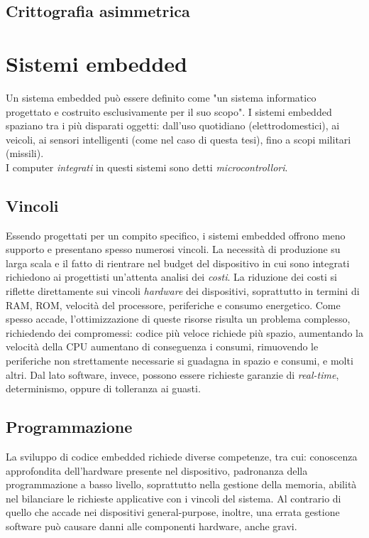 \documentclass[target=bach,aauheader=,style=]{thud}
\begin{document}
        \subsection{Crittografia asimmetrica}

    \section{Sistemi embedded}
    Un sistema embedded può essere definito come "un sistema informatico progettato e costruito esclusivamente per il suo scopo"\cite{embeddedsys}.
    I sistemi embedded spaziano tra i più disparati oggetti: dall'uso quotidiano (elettrodomestici), ai veicoli, ai sensori intelligenti (come nel caso di questa tesi), fino a scopi militari (missili).\\
    I computer \textit{integrati} in questi sistemi sono detti \textit{microcontrollori}\cite{architetture}.
    
    	\subsection{Vincoli}
    	Essendo progettati per un compito specifico, i sistemi embedded offrono meno supporto e presentano spesso numerosi vincoli. La necessità di produzione su larga scala e il fatto di rientrare nel budget del dispositivo in cui sono integrati richiedono ai progettisti un'attenta analisi dei \textit{costi}. La riduzione dei costi si riflette direttamente sui vincoli \textit{hardware} dei dispositivi, soprattutto in termini di RAM, ROM, velocità del processore, periferiche e consumo energetico. Come spesso accade, l'ottimizzazione di queste risorse risulta un problema complesso, richiedendo dei compromessi: codice più veloce richiede più spazio, aumentando la velocità della CPU aumentano di conseguenza i consumi, rimuovendo le periferiche non strettamente necessarie si guadagna in spazio e consumi, e molti altri.
    	Dal lato software, invece, possono essere richieste garanzie di \textit{real-time}, determinismo, oppure di tolleranza ai guasti.\cite{embeddedsys}
    	\subsection{Programmazione}
    	La sviluppo di codice embedded richiede diverse competenze, tra cui: conoscenza approfondita dell'hardware presente nel dispositivo, padronanza della programmazione a basso livello, soprattutto nella gestione della memoria, abilità nel bilanciare le richieste applicative con i vincoli del sistema.
    	Al contrario di quello che accade nei dispositivi general-purpose, inoltre, una errata gestione software può causare danni alle componenti hardware, anche gravi.
\end{document}
